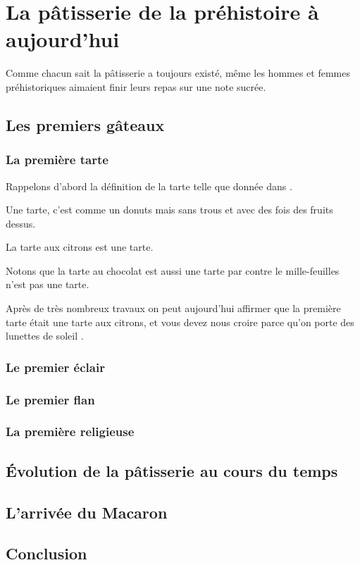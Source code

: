 
\section{La pâtisserie de la préhistoire à aujourd'hui}

Comme chacun sait la pâtisserie a toujours existé, même les hommes et femmes préhistoriques aimaient finir leurs repas sur une note sucrée.

\subsection{Les premiers gâteaux}


\subsubsection{La première tarte}

Rappelons d'abord la définition de la tarte telle que donnée dans \cite{S2012}.

\begin{definition}[Tarte]
  Une tarte, c'est comme un donuts mais sans trous et avec des fois des fruits dessus.
\end{definition}

\begin{example}[Tarte]
  La tarte aux citrons est une tarte.
\end{example}

\begin{remark}
  Notons que la tarte au chocolat est aussi une tarte par contre le mille-feuilles n'est pas une tarte.
\end{remark}

Après de très nombreux travaux on peut aujourd'hui affirmer que la première tarte était une tarte aux citrons, et vous devez nous croire parce qu'on porte des lunettes de soleil \cite{C2012}.

\subsubsection{Le premier éclair}

\subsubsection{Le premier flan}

\subsubsection{La première religieuse}


\subsection{Évolution de la pâtisserie au cours du temps}

\subsection{L'arrivée du Macaron}

\subsection{Conclusion}